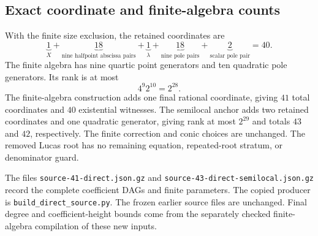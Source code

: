 \subsection{Exact coordinate and finite-algebra counts}

With the finite size exclusion, the retained coordinates are
\[
 \underbrace{1}_{X}+
 \underbrace{18}_{\text{nine halfpoint abscissa pairs}}+
 \underbrace{1}_{\lambda}+
 \underbrace{18}_{\text{nine pole pairs}}+
 \underbrace{2}_{\text{scalar pole pair}}=40.
\]
The finite algebra has nine quartic point generators and ten
quadratic pole generators.  Its rank is at most
\[
                            4^9 2^{10}=2^{28}.
\]
The finite-algebra construction adds one final rational coordinate,
giving $41$ total coordinates and $40$ existential witnesses.
The semilocal anchor adds two retained coordinates and one
quadratic generator, giving rank at most $2^{29}$ and totals
$43$ and $42$, respectively.  The finite correction and conic
choices are unchanged.  The removed Lucas root has no remaining
equation, repeated-root stratum, or denominator guard.

The files \texttt{source-41-direct.json.gz} and
\texttt{source-43-direct-semilocal.json.gz} record the complete
coefficient DAGs and finite parameters.  The copied producer is
\texttt{build\_direct\_source.py}.  The frozen earlier source
files are unchanged.  Final degree and coefficient-height bounds
come from the separately checked finite-algebra compilation of
these new inputs.
